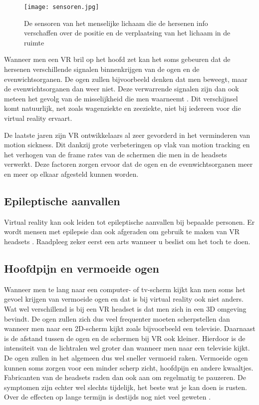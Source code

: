 \begin{figure}[h]
    \centering
    \texttt{[image: sensoren.jpg]}
    \caption{De sensoren van het menselijke lichaam die de hersenen info verschaffen over de positie en de verplaatsing van het lichaam in de ruimte \autocite{Dizzy2018}}
\end{figure}

Wanneer men een VR bril op het hoofd zet kan het soms gebeuren dat de hersenen verschillende signalen binnenkrijgen van de ogen en de evenwichtsorganen. De ogen zullen bijvoorbeeld denken dat men beweegt, maar de evenwichtsorganen dan weer niet. Deze verwarrende signalen zijn dan ook meteen het gevolg van de misselijkheid die men waarneemt \autocite{Kraft2017}. Dit verschijnsel komt natuurlijk, net zoals wagenziekte en zeeziekte, niet bij iedereen voor die virtual reality ervaart.

\pagebreak
De laatste jaren zijn VR ontwikkelaars al zeer gevorderd in het verminderen van motion sickness. Dit dankzij grote verbeteringen op vlak van motion tracking en het verhogen van de frame rates van de schermen die men in de headsets verwerkt. Deze factoren zorgen ervoor dat de ogen en de evenwichtsorganen meer en meer op elkaar afgesteld kunnen worden.

\subsection{Epileptische aanvallen}
Virtual reality kan ook leiden tot epileptische aanvallen bij bepaalde personen. Er wordt mensen met epilepsie dan ook afgeraden om gebruik te maken van VR headsets \autocite{Bolluyt2017}. Raadpleeg zeker eerst een arts wanneer u beslist om het toch te doen.

\subsection{Hoofdpijn en vermoeide ogen}
Wanneer men te lang naar een computer- of tv-scherm kijkt kan men soms het gevoel krijgen van vermoeide ogen en dat is bij virtual reality ook niet anders. Wat wel verschillend is bij een VR headset is dat men zich in een 3D omgeving bevindt. De ogen zullen zich dus veel frequenter moeten scherpstellen dan wanneer men naar een 2D-scherm kijkt zoals bijvoorbeeld een televisie. Daarnaast is de afstand tussen de ogen en de schermen bij VR ook kleiner. Hierdoor is de intensiteit van de lichtralen wel groter dan wanneer men naar een televisie kijkt. De ogen zullen in het algemeen dus wel sneller vermoeid raken. Vermoeide ogen kunnen soms zorgen voor een minder scherp zicht, hoofdpijn en andere kwaaltjes. Fabricanten van de headsets raden dan ook aan om regelmatig te pauzeren. De symptomen zijn echter wel slechts tijdelijk, het beste wat je kan doen is rusten. Over de effecten op lange termijn is destijds nog niet veel geweten \autocite{Bolluyt2017}.


